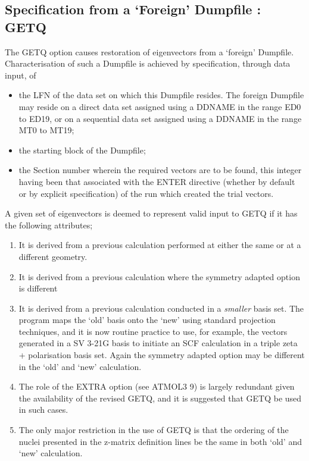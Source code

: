 \documentclass[11pt,fleqn]{article}
\begin{document}
\subsection{Specification from a `Foreign' Dumpfile : GETQ}

The GETQ option causes restoration of eigenvectors from a `foreign'
Dumpfile. Characterisation of such a Dumpfile is achieved by
specification, through data input, of

\begin{itemize}
\item  the LFN of the data set on which this Dumpfile resides. The
foreign Dumpfile may reside on a direct data set assigned
using a DDNAME in the range ED0 to ED19, or on a sequential data set
assigned using a DDNAME in the range MT0 to MT19;
\item  the starting block of the Dumpfile;
\item  the Section number wherein the required vectors are to be found,
this integer having been that associated with the ENTER directive
(whether by default or by explicit specification) of the run which
created the trial vectors.
\end{itemize}

A given set of eigenvectors is deemed to represent valid input to GETQ
if it has the following attributes;
\begin{enumerate}
\item  It is derived from a previous calculation performed
at either the same or at a different geometry.
\item  It is derived from a previous calculation where the symmetry adapted
option is different
\item  It is derived from a previous calculation conducted in a {\em smaller}
basis set. The program maps the `old' basis onto the `new' using
standard projection techniques, and it is now routine practice to use,
for example, the vectors generated in a SV 3-21G basis to initiate
an SCF calculation in a triple zeta + polarisation basis set.
Again the symmetry adapted option may be different in the `old' and
`new' calculation.
\item  The role of the EXTRA option (see ATMOL3 9) is largely
redundant given the availability of the revised GETQ, and it is
suggested that GETQ be used in such cases.
\item  The only major restriction in the use of GETQ is that the
ordering of the nuclei presented in the z-matrix definition lines
be the same in both `old' and `new' calculation.
\end{enumerate}
\end{document}
